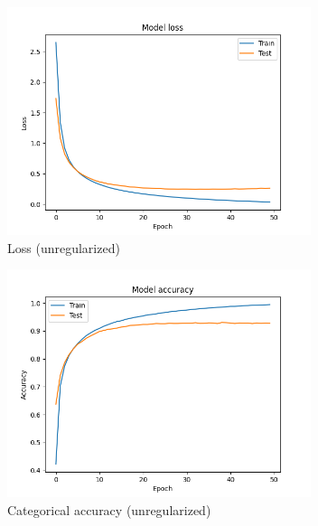 \documentclass[compsoc]{IEEEtran}
\begin{document}
\begin{figure}[ht!]
\centering                                                                        
\includegraphics[width=3.5in]{../images/noreg/loss-sigmoid-categorical_crossentropy-Adam-50-256-final.png}
\captionsetup{justification=centering}                                                                                                                                   
\caption{Loss (unregularized)}
\label{fig:loss1}                                                                                                                                                           
\end{figure}


\begin{figure}[ht!]
\centering                                                                        
\includegraphics[width=3.5in]{../images/noreg/accuracy-sigmoid-categorical_crossentropy-Adam-50-256-final.png}
\captionsetup{justification=centering}                                                                                                                                   
\caption{Categorical accuracy (unregularized)}
\label{fig:acc1}                                                                                                                                          
\end{figure} 
\end{document}
